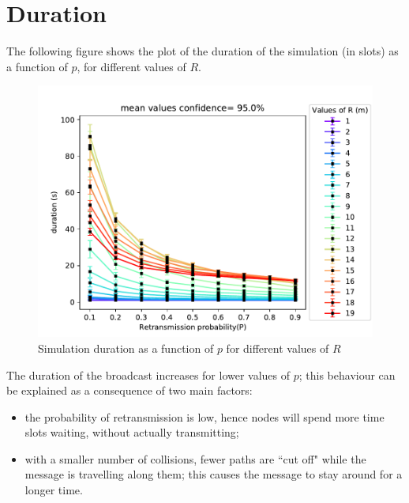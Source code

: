 \section{Duration}\label{sec:duration}
The following figure shows the plot of the duration of the simulation (in
slots) as a function of $p$, for different values of $R$.
\begin{figure}[H]
    \begin{center}
        \includegraphics[scale=.67,trim={0 0 0 0.8cm},clip]{img/big_duration (s)_p_mean_95.0.pdf}
    \end{center}
    \vspace*{-0.5cm}
    \caption{Simulation duration as a function of $p$ for different values of $R$}
    \label{fig:durationPR}
\end{figure}
\noindent
The duration of the broadcast increases for lower values of $p$; this behaviour can be
explained as a consequence of two main factors:
\begin{itemize}
    \item the probability of retransmission is low, hence nodes will spend more
    time slots waiting, without actually transmitting;
    \item with a smaller number of collisions, fewer paths are ``cut off" while the message is travelling along them; this causes the message to stay around for a longer time.
\end{itemize}
